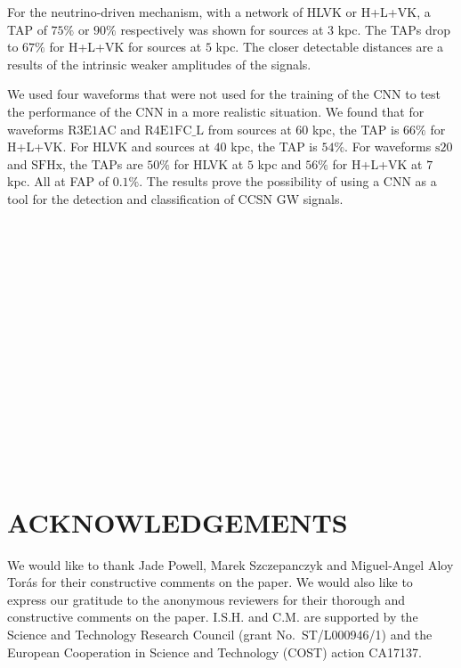 \documentclass[aps,twocolumn,showpacs,groupedaddress, nofootinbib]{revtex4}  %
\begin{document}
For the neutrino-driven mechanism, with a network of HLVK or H+L+VK, 
a \ac{TAP} of $75\%$ or $90\%$ respectively was shown for sources at $3$ kpc. 
The \acp{TAP} drop to $67\%$ for H+L+VK for sources at $5$ kpc. 
The closer detectable distances are a results of the intrinsic weaker amplitudes of the signals.
%
%

We used four waveforms that were not used for the training of the \ac{CNN} to
test the performance of the \ac{CNN} in a more realistic situation. We found
that for waveforms $\text{R3E1AC}$ and $\text{R4E1FC\_L}$ from sources at
$60$ kpc, the \ac{TAP} is $66\%$ for H+L+VK.
For HLVK and sources at $40$ kpc, the \ac{TAP} is $54\%$.
For waveforms $\text{s}20$ and $\text{SFHx}$, the \acp{TAP} are $50\%$ for HLVK at $5$ kpc 
and $56\%$ for H+L+VK at $7$ kpc. All at \ac{FAP} of $0.1\%$. 
The results prove the possibility of
using a \ac{CNN} as a tool for the detection and classification of \ac{CCSN}
\ac{GW} signals.
\\
\\
\\
\\
\\
\\
\\
\\
\\
\\
\\
\\
\\
\\
\\
\\
\section{ACKNOWLEDGEMENTS}
We would like to thank Jade Powell, Marek Szczepanczyk and Miguel-Angel Aloy Torás for their 
constructive comments on the paper.
We would also like to express our gratitude to the anonymous reviewers for their 
thorough and constructive comments on the paper.
I.S.H. and C.M. are supported by the Science and Technology Research Council
(grant No.~ST/L000946/1) and the European Cooperation in Science and
Technology (COST) action CA17137. 
\clearpage 

%
\end{document}
